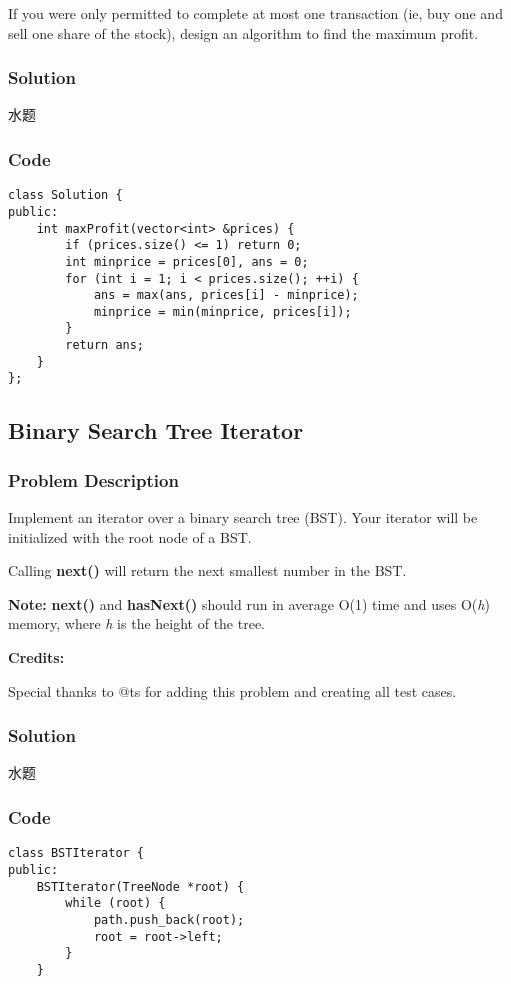 \documentclass[courier]{article}
\begin{document}
\begin{CJK*}{UTF8}{gkai}
If you were only permitted to complete at most one transaction (ie, buy one and sell one share of the stock), design an algorithm to find the maximum profit.



\subsubsection*{Solution}
水题

\subsubsection*{Code}
\begin{lstlisting}
class Solution {
public:
    int maxProfit(vector<int> &prices) {
        if (prices.size() <= 1) return 0;
        int minprice = prices[0], ans = 0;
        for (int i = 1; i < prices.size(); ++i) {
            ans = max(ans, prices[i] - minprice);
            minprice = min(minprice, prices[i]);
        }
        return ans;
    }
}; 
\end{lstlisting}


\subsection{ Binary Search Tree Iterator }

\subsubsection*{Problem Description}
Implement an iterator over a binary search tree (BST). Your iterator will be initialized with the root node of a BST.

Calling \textbf{next()} will return the next smallest number in the BST.

\textbf{Note: }\textbf{next()} and \textbf{hasNext()} should run in average O(1) time and uses O(\emph{h}) memory, where \emph{h} is the height of the tree.

\textbf{Credits:}

Special thanks to @ts for adding this problem and creating all test cases.



\subsubsection*{Solution}
水题

\subsubsection*{Code}
\begin{lstlisting}
class BSTIterator {
public:
    BSTIterator(TreeNode *root) {
        while (root) {
            path.push_back(root);
            root = root->left;
        }
    }
    

\end{lstlisting}
\end{CJK*}
\end{document}
